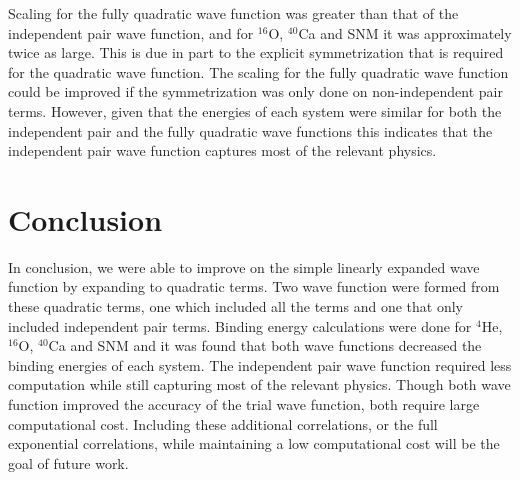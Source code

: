 \documentclass[aps,prl,reprint,superscriptaddress]{revtex4-1}
\begin{document}
Scaling for the fully quadratic wave function was greater than that of the independent pair wave function, and for $^{16}$O, $^{40}$Ca and SNM it was approximately twice as large. This is due in part to the explicit symmetrization that is required for the quadratic wave function. The scaling for the fully quadratic wave function could be improved if the symmetrization was only done on non-independent pair terms. However, given that the energies of each system were similar for both the independent pair and the fully quadratic wave functions this indicates that the independent pair wave function captures most of the relevant physics.

\section{Conclusion}
In conclusion, we were able to improve on the simple linearly expanded wave function by expanding to quadratic terms. Two wave function were formed from these quadratic terms, one which included all the terms and one that only included independent pair terms. Binding energy calculations were done for $^4$He, $^{16}$O, $^{40}$Ca and SNM and it was found that both wave functions decreased the binding energies of each system. The independent pair wave function required less computation while still capturing most of the relevant physics. Though both wave function improved the accuracy of the trial wave function, both require large computational cost. Including these additional correlations, or the full exponential correlations, while maintaining a low computational cost will be the goal of future work.


%
\end{document}
